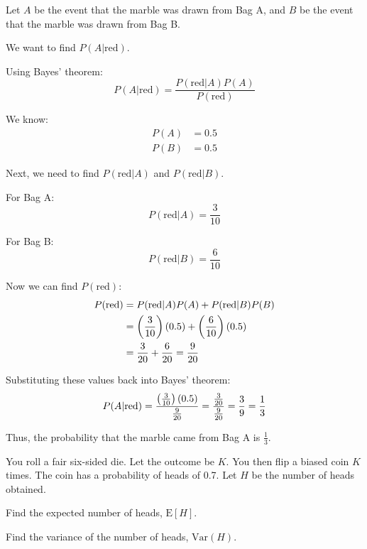 \documentclass[a4paper, 10pt]{article}
\begin{document}
\begin{solution}
	Let \( A \) be the event that the marble was drawn from Bag A,
	and \( B \) be the event that the marble was drawn from Bag B.

	\myspace

	We want to find \( P(A | \text{red}) \).

	Using Bayes' theorem:
	\[
		P(A | \text{red}) = \frac{P(\text{red} | A) P(A)}{P(\text{red})}
	\]

	We know:
	\begin{align*}
		P(A) & = 0.5 \\
		P(B) & = 0.5
	\end{align*}

	Next, we need to find \( P(\text{red} | A) \) and \( P(\text{red} | B) \).

	For Bag A:
	\[
		P(\text{red} | A) = \frac{3}{10}
	\]

	For Bag B:
	\[
		P(\text{red} | B) = \frac{6}{10}
	\]

	Now we can find \( P(\text{red}) \):
	\begin{align*}
		P(\text{red}) & = P(\text{red} | A) P(A) + P(\text{red} | B) P(B)       \\
		              & = \left(\frac{3}{10}\right)(0.5) + \left(\frac{6}{10}\right)(0.5) \\
		              & = \frac{3}{20} + \frac{6}{20} = \frac{9}{20}
	\end{align*}

	Substituting these values back into Bayes' theorem:
	\[
		P(A | \text{red}) = \frac{\left(\frac{3}{10}\right)(0.5)}{\frac{9}{20}} = \frac{\frac{3}{20}}{\frac{9}{20}} = \frac{3}{9} = \frac{1}{3}
	\]

	Thus, the probability that the marble came from Bag A is \( \boxed{\frac{1}{3}} \).
\end{solution}

\begin{problem}
You roll a fair six-sided die. Let the outcome be \( K \).
You then flip a biased coin \( K \) times. The coin has a probability of heads of 0.7.
Let \( H \) be the number of heads obtained.
\begin{subproblems_alpha}
	\item Find the expected number of heads, \( \text{E}[H] \).
	\item Find the variance of the number of heads, \( \text{Var}(H) \).
\end{subproblems_alpha}
\end{problem}
\end{document}
